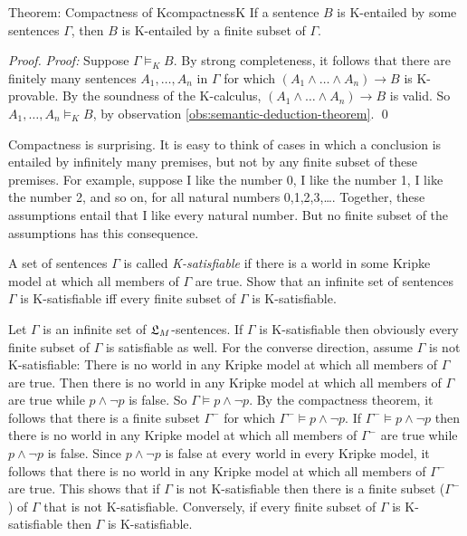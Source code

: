 \begin{theorem}{Theorem: Compactness of K}{compactnessK}
  If a sentence $B$ is K-entailed by some sentences $\Gamma$, then $B$ is
  K-entailed by a finite subset of $\Gamma$.
\end{theorem}
\begin{proof}
  \emph{Proof:} Suppose $\Gamma \models_{K} B$. By strong completeness, it
  follows that there are finitely many sentences $A_{1},\ldots,A_{n}$ in
  $\Gamma$ for which $(A_{1}\land\ldots\land A_{n}) \to B$ is K-provable. By the
  soundness of the K-calculus, $(A_{1}\land\ldots\land A_{n}) \to B$ is valid.
  So $A_{1},\ldots,A_{n} \models_{K} B$, by observation
  \ref{obs:semantic-deduction-theorem}. \qed
\end{proof}

Compactness is surprising. It is easy to think of cases in which a conclusion is
entailed by infinitely many premises, but not by any finite subset of these
premises. For example, suppose I like the number 0, I like the number 1, I like
the number 2, and so on, for all natural numbers 0,1,2,3,\ldots. Together, these
assumptions entail that I like every natural number. But no finite subset of the
assumptions has this consequence.

\begin{exercise}
  A set of sentences $\Gamma$ is called \emph{K-satisfiable} if there is a world
  in some Kripke model at which all members of $\Gamma$ are true. Show that an
  infinite set of sentences $\Gamma$ is K-satisfiable iff every finite subset of
  $\Gamma$ is K-satisfiable.
\end{exercise}
\begin{solution}
  Let $\Gamma$ is an infinite set of $\mathfrak{L}_{M}$-sentences. If $\Gamma$ is
  K-satisfiable then obviously every finite subset of $\Gamma$ is satisfiable as
  well. For the converse direction, assume $\Gamma$ is not K-satisfiable: There
  is no world in any Kripke model at which all members of $\Gamma$ are true.
  Then there is no world in any Kripke model at which all members of $\Gamma$
  are true while $p \land \neg p$ is false. So $\Gamma \models p\land \neg p$.
  By the compactness theorem, it follows that there is a finite subset
  $\Gamma^{-}$ for which $\Gamma^{-} \models p \land \neg p$. If
  $\Gamma^{-} \models p \land \neg p$ then there is no world in any Kripke model
  at which all members of $\Gamma^{-}$ are true while $p \land \neg p$ is false.
  Since $p\land \neg p$ is false at every world in every Kripke model, it
  follows that there is no world in any Kripke model at which all members of
  $\Gamma^{-}$ are true. This shows that if $\Gamma$ is not K-satisfiable then
  there is a finite subset ($\Gamma^{-}$) of $\Gamma$ that is not K-satisfiable.
  Conversely, if every finite subset of $\Gamma$ is K-satisfiable then $\Gamma$
  is K-satisfiable.
\end{solution}

